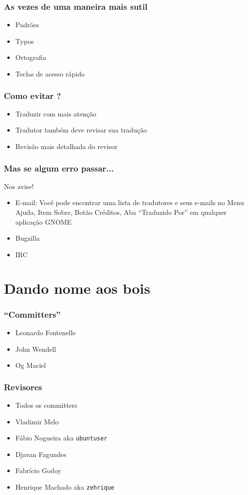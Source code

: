 \documentclass{beamer}
\begin{document}
\begin{frame}
  \frametitle{As vezes de uma maneira mais sutil}
  \begin{itemize}[<+->]
    \item Padrões
    \item Typos
    \item Ortografia  
    \item Teclas de acesso rápido
  \end{itemize}
\end{frame}

\begin{frame}
  \frametitle{Como evitar ?}

  \begin{itemize}[<+->]
    \item Traduzir com mais atenção
    \item Tradutor também deve revisar sua tradução
    \item Revisão mais detalhada do revisor
  \end{itemize}
\end{frame}

\begin{frame}
  \frametitle{Mas se algum erro passar...}
  Nos avise!
  \begin{itemize}[<+->]
    \item E-mail: Você pode encontrar uma lista de tradutores e seus e-mails no Menu Ajuda, Item Sobre, Botão Créditos, Aba ``Traduzido Por'' em qualquer aplicação GNOME
    \item Bugzilla
    \item IRC
  \end{itemize}
\end{frame}


\section{Dando nome aos bois}

\begin{frame}
    \frametitle{``Committers''}
    \begin{itemize}
        \item Leonardo Fontenelle 
        \item John Wendell
        \item Og Maciel
    \end{itemize}
\end{frame}

\begin{frame}[fragile]
    \frametitle{Revisores}
    \begin{itemize}
        \item Todos os committers
        \item Vladimir Melo 
        \item Fábio Nogueira aka \verb#ubuntuser#
        \item Djavan Fagundes
        \item Fabrício Godoy
        \item Henrique Machado aka \verb#zehrique#    
    \end{itemize}
\end{frame}
\end{document}
